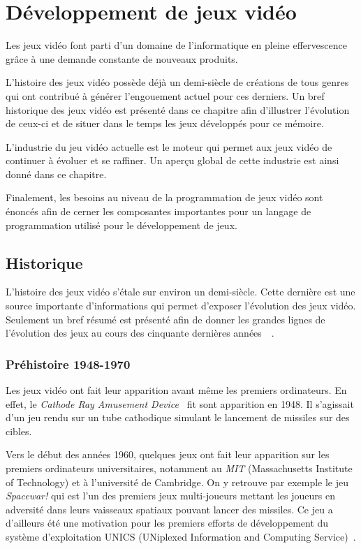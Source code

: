 \documentclass[12pt,twoside,letterpaper,francais]{book}
\begin{document}
\chapter{Développement de jeux vidéo} \label{Chap:JV}
Les jeux vidéo font parti d'un domaine de l'informatique en pleine
effervescence grâce à une demande constante de nouveaux
produits. 

L'histoire des jeux vidéo possède déjà un demi-siècle de créations de
tous genres qui ont contribué à générer l'engouement actuel pour ces
derniers. Un bref historique des jeux vidéo est présenté dans ce
chapitre afin d'illustrer l'évolution de ceux-ci et de situer
dans le temps les jeux développés pour ce mémoire.

L'industrie du jeu vidéo actuelle est le moteur qui permet aux jeux
vidéo de continuer à évoluer et se raffiner. Un aperçu global de cette
industrie est ainsi donné dans ce chapitre.

Finalement, les besoins au niveau de la programmation de jeux vidéo
sont énoncés afin de cerner les composantes importantes pour un
langage de programmation utilisé pour le développement de jeux.


\FloatBarrier
\section{Historique}
L'histoire des jeux vidéo s'étale sur environ un demi-siècle. Cette
dernière est une source importante d'informations qui permet d'exposer
l'évolution des jeux vidéo. Seulement un bref résumé est présenté afin
de donner les grandes lignes de l'évolution des jeux au cours des
cinquante dernières années~\cite{VIDEOGAMES_history}~\cite{HISCORE}.

\FloatBarrier
\subsection{Préhistoire 1948-1970}
Les jeux vidéo ont fait leur apparition avant même les premiers
ordinateurs. En effet, le \textit{Cathode Ray Amusement
  Device}~\cite{CRTAD} fit sont apparition en 1948. Il s'agissait d'un
jeu rendu sur un tube cathodique simulant le lancement de missiles sur
des cibles.

Vers le début des années 1960, quelques jeux ont fait leur apparition
sur les premiers ordinateurs universitaires, notamment au \textit{MIT}
(Massachusetts Institute of Technology) et à l'université de
Cambridge. On y retrouve par exemple le jeu \textit{Spacewar!} qui est
l'un des premiers jeux multi-joueurs mettant les joueurs en adversité
dans leurs vaisseaux spatiaux pouvant lancer des missiles. Ce jeu a
d'ailleurs été une motivation pour les premiers efforts de
développement du système d'exploitation UNICS (UNiplexed Information
and Computing Service)~\cite{SPACEWAR-UNICS}.
\end{document}
